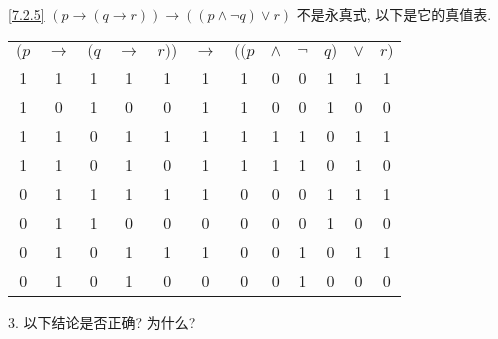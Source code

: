 \documentclass[boxes]{homework}
\begin{document}
\begin{solution}
\begin{center}
\begin{tabular}{cccc|c|ccccccccc}
        \end{tabular}
    \end{center}
    \ref{7.2.5} $(p\to(q\to r))\to((p\land\lnot q)\lor r)$ 不是永真式, 以下是它的真值表.
    \begin{center}
        \begin{tabular}{ccccc|c|cccccc}
            $(p$ & $\to$ & $(q$ & $\to$ & $r))$ & $\to$ & $((p$ & $\land$ & $\lnot$ & $q)$ & $\lor$ & $r)$ \\
            1    & 1     & 1    & 1     & 1     & 1     & 1     & 0       & 0       & 1    & 1      & 1    \\
            1    & 0     & 1    & 0     & 0     & 1     & 1     & 0       & 0       & 1    & 0      & 0    \\
            1    & 1     & 0    & 1     & 1     & 1     & 1     & 1       & 1       & 0    & 1      & 1    \\
            1    & 1     & 0    & 1     & 0     & 1     & 1     & 1       & 1       & 0    & 1      & 0    \\
            0    & 1     & 1    & 1     & 1     & 1     & 0     & 0       & 0       & 1    & 1      & 1    \\
            0    & 1     & 1    & 0     & 0     & 0     & 0     & 0       & 0       & 1    & 0      & 0    \\
            0    & 1     & 0    & 1     & 1     & 1     & 0     & 0       & 1       & 0    & 1      & 1    \\
            0    & 1     & 0    & 1     & 0     & 0     & 0     & 0       & 1       & 0    & 0      & 0
        \end{tabular}
    \end{center}
\end{solution}
\begin{problem}
3. 以下结论是否正确? 为什么?
\end{problem}
\end{document}
